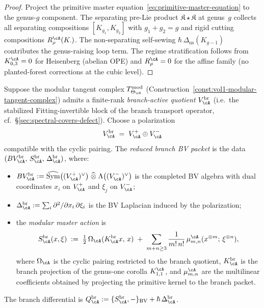 \begin{proof}
Project the primitive master
equation~\eqref{eq:primitive-master-equation}
to the genus-$g$ component.  The separating pre-Lie product
$\mathfrak{K} \star \mathfrak{K}$ at genus~$g$ collects all
separating compositions $[K_{g_1}, K_{g_2}]$ with
$g_1 + g_2 = g$ and rigid cutting compositions
$R_\rho^\cA(K_{\cdot})$.  The non-separating self-sewing
$\hbar\,\Delta_{\mathrm{ns}}(K_{g-1})$ contributes the
genus-raising loop term.  The regime stratification follows from
$K_{0,3}^\cA = 0$ for Heisenberg (abelian OPE) and
$R_\rho^\cA = 0$ for the affine family (no planted-forest
corrections at the cubic level).
\end{proof}

\begin{definition}
\label{def:reduced-branch-master-action}
Suppose the modular tangent complex
$T_{\Theta_\cA}^{\mathrm{mod}}$
(Construction~\ref{const:vol1-modular-tangent-complex})
admits a finite-rank \emph{branch-active quotient}
$V_\cA^{\mathrm{br}}$ (i.e.\ the stabilized Fitting-invertible
block of the branch transport operator, cf.\
\S\ref{sec:spectral-covers-defect}).  Choose a polarization
\begin{equation}
\label{eq:branch-polarization}
V_\cA^{\mathrm{br}}
\;=\;
V_\cA^+ \oplus V_\cA^-
\end{equation}
compatible with the cyclic pairing.
The \emph{reduced branch BV packet} is the
data $(BV_\cA^{\mathrm{br}},\, S_\cA^{\mathrm{br}},\,
\Delta_\cA^{\mathrm{br}})$, where:
\begin{itemize}
\item
$BV_\cA^{\mathrm{br}}
:= \widehat{\operatorname{Sym}}\bigl((V_\cA^+)^\vee\bigr)
\;\widehat\otimes\;
\Lambda\bigl((V_\cA^-)^\vee\bigr)$
is the completed BV algebra with dual coordinates
$x_i$ on $V_\cA^+$ and $\xi_j$ on $V_\cA^-$;
\item
$\Delta_\cA^{\mathrm{br}}
:= \sum_i \partial^2 / \partial x_i\,\partial\xi_i$
is the BV Laplacian induced by the polarization;
\item the \emph{modular master action} is
\begin{equation}
\label{eq:branch-master-action}
S_\cA^{\mathrm{br}}(x,\xi)
\;:=\;
\tfrac{1}{2}\,\Omega_\cA(K_\cA^{\mathrm{br}} x,\, x)
\;+\;
\sum_{m+n \geq 3}
\frac{1}{m!\, n!}\,
\mu^{\cA}_{m,n}(x^{\otimes m};\, \xi^{\otimes n}),
\end{equation}
where $\Omega_\cA$ is the cyclic pairing restricted to the
branch quotient, $K_\cA^{\mathrm{br}}$ is the branch projection of the
genus-one corolla $K_{1,1}^\cA$, and $\mu^{\cA}_{m,n}$ are the
multilinear coefficients obtained by projecting the primitive
kernel to the branch packet.
\end{itemize}
The branch differential is
$Q_\cA^{\mathrm{br}} := \{S_\cA^{\mathrm{br}}, -\}_{\mathrm{BV}}
+ \hbar\,\Delta_\cA^{\mathrm{br}}$.
\end{definition}


